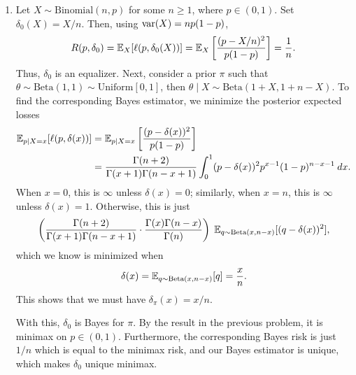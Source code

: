 \documentclass[11pt]{article}
\begin{document}
\begin{enumerate}
        \item Let $X \sim \text{Binomial}(n, p)$ for some $n \geq 1$, where $p
        \in (0, 1)$.
        Set $\delta_0(X) = X / n$.
        Then, using $\operatorname{var}(X) = np(1 - p)$, \[
            R(p, \delta_0)
                = \mathbb{E}_{X}[\ell(p, \delta_0(X))]
                = \mathbb{E}_{X}\left[\frac{(p - X / n)^2}{p(1 - p)}\right]
                = \frac{1}{n}.
        \] Thus, $\delta_0$ is an equalizer.
        Next, consider a prior $\pi$ such that $\theta \sim \text{Beta}(1, 1)
        \sim \text{Uniform}[0, 1]$, then $\theta \mid X \sim \text{Beta}(1 + X,
        1 + n - X)$.
        To find the corresponding Bayes estimator, we minimize the posterior
        expected losses \begin{align*}
            \mathbb{E}_{p\mid X = x}[\ell(p, \delta(x))]
                &= \mathbb{E}_{p\mid X = x}\left[\frac{(p - \delta(x))^2}{p(1 - p)}\right] \\
                &= \frac{\Gamma(n + 2)}{\Gamma(x + 1)\Gamma(n - x + 1)}\int_0^1 (p - \delta(x))^2 p^{x - 1} (1 - p)^{n - x - 1} \:dx.
        \end{align*}
        When $x = 0$, this is $\infty$ unless $\delta(x) = 0$; similarly, when
        $x = n$, this is $\infty$ unless $\delta(x) = 1$.
        Otherwise, this is just \[
                \left(\frac{\Gamma(n + 2)}{\Gamma(x + 1)\Gamma(n - x + 1)}\cdot\frac{\Gamma(x)\Gamma(n - x)}{\Gamma(n)}\right)\; \mathbb{E}_{q \sim \text{Beta}(x, n - x)}[(q - \delta(x))^2],
        \] which we know is minimized when \[
            \delta(x)
                = \mathbb{E}_{q \sim \text{Beta}(x, n - x)}[q]
                = \frac{x}{n}.
        \] This shows that we must have $\delta_\pi(x) = x / n$.

        With this, $\delta_0$ is Bayes for $\pi$.
        By the result in the previous problem, it is minimax on $p \in (0, 1)$.
        Furthermore, the corresponding Bayes risk is just $1 / n$ which is
        equal to the minimax risk, and our Bayes estimator is unique, which
        makes $\delta_0$ unique minimax.




\end{enumerate}
\end{document}
